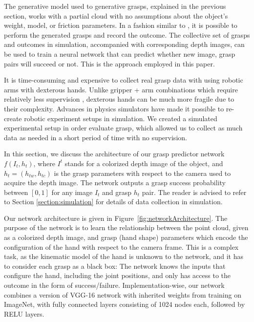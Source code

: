 
The generative model used to generative grasps, explained in the previous section, works with a partial cloud with no assumptions about the object's weight, model, or friction parameters. In a fashion similar to \cite{Levine1}, it is possible to perform the generated grasps and record the outcome. The collective set of grasps and outcomes in simulation, accompanied with corresponding depth images, can be used to train a neural network that can predict whether new image, grasp pairs will succeed or not. This is the approach employed in this paper. 

It is time-consuming and expensive to collect real grasp data with using robotic arms with dexterous hands. Unlike gripper + arm combinations which require relatively less supervision \cite{Levine1}, dexterous hands can be much more fragile due to their complexity. Advances in physics simulators have made it possible to re-create robotic experiment setups in simulation. We created a simulated experimental setup in order evaluate grasp, which allowed us to collect as much data as needed in a short period of time with no supervision.

In this section, we discuss the architecture of our grasp predictor network $f(I_t, h_t)$, where $I^t$ stands for a colorized depth image of the object, and $h_t = (h_{tw}, h_{tc})$ is the grasp parameters with respect to the camera used to acquire the depth image. The network outputs a grasp success probability between $[0,1]$ for any image $I_t$ and grasp $h_t$ pair. The reader is advised to refer to Section \ref{section:simulation} for details of data collection in simulation.

Our network architecture is given in Figure~\ref{fig:networkArchitecture}. The purpose of the network is to learn the relationship between the point cloud, given as a colorized depth image, and grasp (hand shape) parameters which encode the configuration of the hand with respect to the camera frame. This is a complex task, as the kinematic model of the hand is unknown to the network, and it has to consider each grasp as a black box: The network knows the inputs that configure the hand, including the joint positions, and only has access to the outcome in the form of success/failure. Implementation-wise, our network combines a version of VGG-16 network with inherited weights from training on ImageNet, with fully connected layers consisting of 1024 nodes each, followed by RELU layers. 

